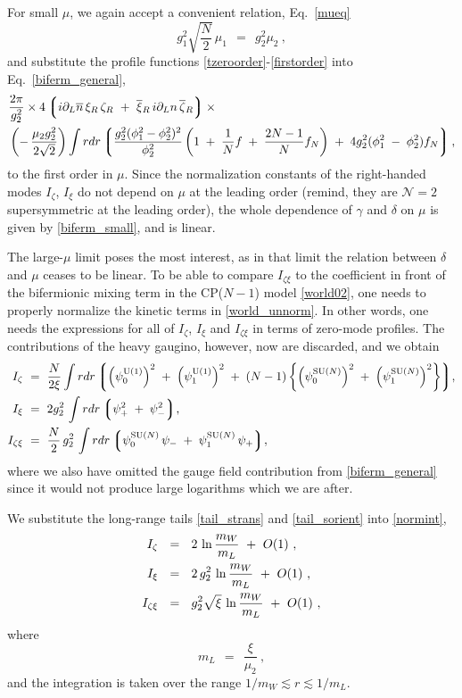 \documentclass[12pt]{article}
\newcommand{\ntwo}{${\mathcal N}=2$ }
\newcommand{\p}{\partial}
\newcommand{\ov}{\overline}
\newcommand{\lgr}{\left\lgroup}
\newcommand{\rgr}{\right\rgroup}
\newcommand{\poU}{\psi_0^{\rm U(1)}}
\newcommand{\plU}{\psi_1^{\rm U(1)}}
\newcommand{\poN}{\psi_0^\text{SU($N$)}}
\newcommand{\plN}{\psi_1^\text{SU($N$)}}
\begin{document}
	For small $ \mu $, we again accept a convenient relation, Eq.~\eqref{mueq}
\[
	g_1^2 \sqrt{\frac{N}{2}}\, \mu_1 ~~=~~ g_2^2 \mu_2~,
\]
	and substitute the profile functions \eqref{tzeroorder}-\eqref{firstorder} into Eq.~\eqref{biferm_general},
\begin{align}
%
\label{biferm_small}
	&
	\frac{2\pi}{g_2^2} \times  
	4 \lgr  i\p_L \ov{n}\, \xi_R \, \zeta_R  ~+~  \ov{\xi}{}_R \, i \p_L n\, \ov{\zeta}{}_R \rgr
	\times
	\\
%
\notag
	&
	\left( -\, \frac{\mu_2 g_2^2}{2\sqrt{2}} \right)
	\int r dr 
	\lgr  \frac{g_2^2(\phi_1^2 - \phi_2^2)^2}{\phi_2^2} 
			\left( 1 \;+\; \frac{1}{N} f \;+\; \frac{2N - 1}{N}f_N \right) 
			\;+\;
		4 g_2^2 (\phi_1^2 \;-\; \phi_2^2) f_N \rgr,
\end{align}
	to the first order in $ \mu $.
	Since the normalization constants of the right-handed modes $ I_\zeta $, $ I_\xi $ do not
	depend on $ \mu $ at the leading order (remind, they are \ntwo supersymmetric at the leading order),
	the whole dependence of $ \gamma $ and $ \delta $ on $ \mu $ is given by \eqref{biferm_small},
	and is linear.

	The large-$\mu$ limit poses the most interest, as in that limit the relation between $ \delta $ 
	and $ \mu $ ceases to be linear. 
	To be able to compare $ I_{\zeta\xi} $ to the coefficient in front of the bifermionic mixing term in 
	the CP($ N-1 $) model \eqref{world02}, one needs to properly normalize the kinetic terms in \eqref{world_unnorm}.
	In other words, one needs the expressions for all of $ I_\zeta $, $ I_\xi $ and $ I_{\zeta\xi} $ in terms
	of zero-mode profiles.
	The contributions of the heavy gaugino, however, now are discarded, and we obtain
\begin{align}
%
\notag
	I_\zeta & ~=~ \frac{N}{2\xi} 
		\int r dr 
			\lgr \left(\poU\right)^2 \;+\; \left(\plU\right)^2 \;+\; 
				(N-1)\left\{\left(\poN\right)^2 \;+\;
				            \left(\plN\right)^2 \right\} 
			\rgr \!, \\
%
\label{normint}
	I_\xi & ~=~ 2g_2^2\, 
		\int r dr \lgr  \psi_+^2 \;+\; \psi_-^2 \rgr\!, \\
%
\notag
	I_{\zeta\xi} & ~=~
		\frac{N}{2}\, g_2^2\, 
		\int r dr \lgr \poN\, \psi_- \;+\; \plN\, \psi_+ \rgr \!,
\end{align}
	where we also have omitted the gauge field contribution from \eqref{biferm_general} since it would not
	produce large logarithms which we are after. 

	We substitute the long-range tails \eqref{tail_strans} and \eqref{tail_sorient} into \eqref{normint},
\begin{align}
%
\notag
	I_\zeta & ~~=~~ 2\, \ln \frac{m_W}{m_L} ~+~ O(1)~, \\
%
\label{logs}
	I_\xi & ~~=~~ 2\,g_2^2 \, \ln \frac{m_W}{m_L} ~+~ O(1)~, \\
%
\notag
	I_{\zeta\xi} & ~~=~~ g_2^2\sqrt{\xi}\, \ln \frac{m_W}{m_L} ~+~ O(1)~, 
\end{align}
	where
\[
	m_L ~~=~~ \frac{\xi}{\mu_2}~,
\]
	and the integration is taken over the range $ 1/m_W \lesssim r \lesssim 1/m_L $.
\end{document}
